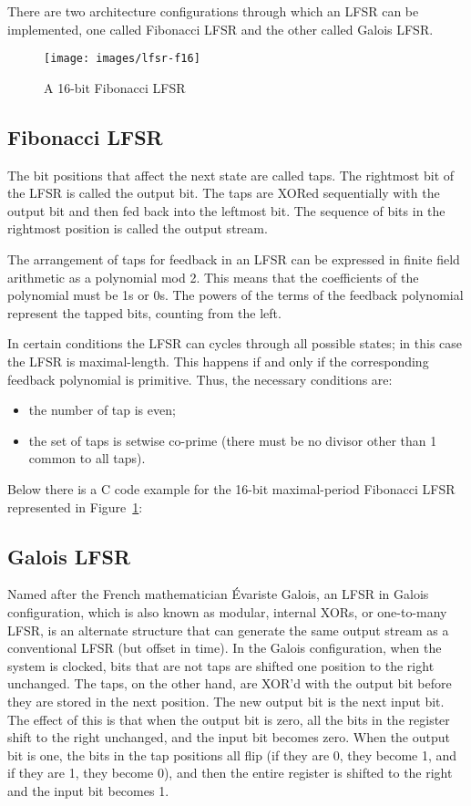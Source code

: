 \documentclass[11pt,a4paper,oneside, openright]{article}
\begin{document}
There are two architecture configurations through which an LFSR can be implemented, one called Fibonacci LFSR and the other called Galois LFSR.

\begin{figure}[!b]
    \centering
    \texttt{[image: images/lfsr-f16]}
    \caption{A 16-bit Fibonacci LFSR}
    \label{fig:lfsr-f16}
\end{figure}

\subsection{Fibonacci LFSR}
The bit positions that affect the next state are called taps. The rightmost bit of the LFSR is called the output bit. The taps are XORed sequentially with the output bit and then fed back into the leftmost bit. The sequence of bits in the rightmost position is called the output stream.

The arrangement of taps for feedback in an LFSR can be expressed in finite field arithmetic as a polynomial mod 2. This means that the coefficients of the polynomial must be 1s or 0s. The powers of the terms of the feedback polynomial represent the tapped bits, counting from the left.

In certain conditions the LFSR can cycles through all possible states; in this case the LFSR is maximal-length. This happens if and only if the corresponding feedback polynomial is primitive. Thus, the necessary conditions are:
\begin{itemize}
    \item the number of tap is even;
    \item the set of taps is setwise co-prime (there must be no divisor other than 1 common to all taps).
\end{itemize}

Below there is a C code example for the 16-bit maximal-period Fibonacci LFSR represented in Figure~\ref{fig:lfsr-f16}:




\subsection{Galois LFSR}
Named after the French mathematician Évariste Galois, an LFSR in Galois configuration, which is also known as modular, internal XORs, or one-to-many LFSR, is an alternate structure that can generate the same output stream as a conventional LFSR (but offset in time). In the Galois configuration, when the system is clocked, bits that are not taps are shifted one position to the right unchanged. The taps, on the other hand, are XOR'd with the output bit before they are stored in the next position. The new output bit is the next input bit. The effect of this is that when the output bit is zero, all the bits in the register shift to the right unchanged, and the input bit becomes zero. When the output bit is one, the bits in the tap positions all flip (if they are 0, they become 1, and if they are 1, they become 0), and then the entire register is shifted to the right and the input bit becomes 1.
\end{document}
